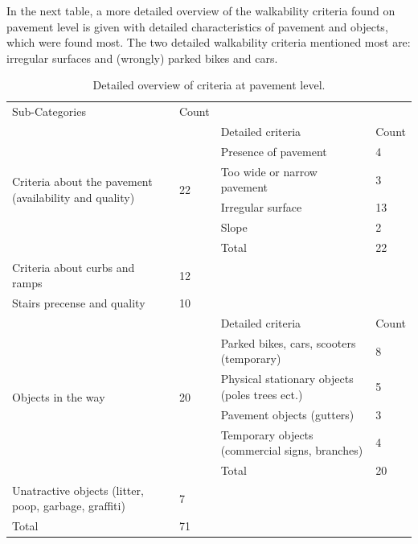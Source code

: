In the next table, a more detailed overview of the walkability criteria found on pavement level is given with detailed characteristics of pavement and objects, which were found most. The two detailed walkability criteria mentioned most are: irregular surfaces and (wrongly) parked bikes and cars. 

\begin{table}[h]
\centering
\caption{Detailed overview of criteria at pavement level. \label{literaturepavement}}
\begin{tabular}{|p{135pt}|p{45pt}||p{135pt}|p{45pt}|}
\cline{1-2}
Sub-Categories & Count \\
\cline{1-2} \cline{1-2} \cline{3-4}
\multirow{6}{135pt}{Criteria about the pavement (availability and quality)} & \multirow{6}{*}{ 22 } & Detailed criteria & Count \\ \cline{3-4}
& & Presence of pavement & 4 \\
& & Too wide or narrow pavement & 3\\
& & Irregular surface & 13 \\
& & Slope & 2 \\
\cline{3-4}
& & Total & 22 \\
\hline

Criteria about curbs and ramps & 12 \\
\cline{1-2}
Stairs precense and quality & 10 \\
\hline
\multirow{6}{*}{Objects in the way} & \multirow{6}{*}{ 20 } & Detailed criteria & Count \\ \cline{3-4}
& & Parked bikes, cars, scooters (temporary) & 8 \\
& & Physical stationary objects (poles trees ect.) & 5\\
& & Pavement objects (gutters) & 3 \\
& & Temporary objects (commercial signs, branches) & 4 \\
\cline{3-4}
& & Total & 20\\
\hline
Unatractive objects (litter, poop, garbage, graffiti) & 7 \\
\cline{1-2} \cline{1-2}
Total & 71 \\
\cline{1-2} 
\end{tabular}
\end{table}





